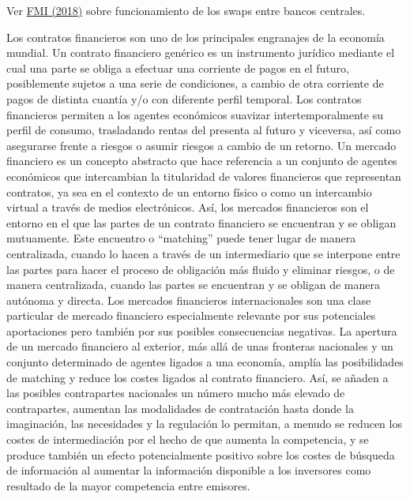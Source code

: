\documentclass{nuevotema}
\begin{document}
\ideaclave

Ver \href{https://www.imf.org/external/pubs/ft/bop/2018/pdf/Clarification0518.pdf}{FMI (2018)} sobre funcionamiento de los swaps entre bancos centrales.

Los contratos financieros son uno de los principales engranajes de la economía mundial. Un contrato financiero genérico es un instrumento jurídico mediante el cual una parte se obliga a efectuar una corriente de pagos en el futuro, posiblemente sujetos a una serie de condiciones, a cambio de otra corriente de pagos de distinta cuantía y/o con diferente perfil temporal. Los contratos financieros permiten a los agentes económicos suavizar intertemporalmente su perfil de consumo, trasladando rentas del presenta al futuro y viceversa, así como asegurarse frente a riesgos o asumir riesgos a cambio de un retorno. Un mercado financiero es un concepto abstracto que hace referencia a un conjunto de agentes económicos que intercambian la titularidad de valores financieros que representan contratos, ya sea en el contexto de un entorno físico o como un intercambio virtual a través de medios electrónicos. Así, los mercados financieros son el entorno en el que las partes de un contrato financiero se encuentran y se obligan mutuamente. Este encuentro o ``matching'' puede tener lugar de manera centralizada, cuando lo hacen a través de un intermediario que se interpone entre las partes para hacer el proceso de obligación más fluido y eliminar riesgos, o de manera centralizada, cuando las partes se encuentran y se obligan de manera autónoma y directa. Los mercados financieros internacionales son una clase particular de mercado financiero especialmente relevante por sus potenciales aportaciones pero también por sus posibles consecuencias negativas. La apertura de un mercado financiero al exterior, más allá de unas fronteras nacionales y un conjunto determinado de agentes ligados a una economía, amplía las posibilidades de matching y reduce los costes ligados al contrato financiero. Así, se añaden a las posibles contrapartes nacionales un número mucho más elevado de contrapartes, aumentan las modalidades de contratación hasta donde la imaginación, las necesidades y la regulación lo permitan, a menudo se reducen los costes de intermediación por el hecho de que aumenta la competencia, y se produce también un efecto potencialmente positivo sobre los costes de búsqueda de información al aumentar la información disponible a los inversores como resultado de la mayor competencia entre emisores. 
\end{document}
